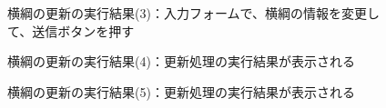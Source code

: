 \documentclass[10pt,a4paper,titlepage]{jreport}
\begin{document}
\begin{figure}[h]
	\begin{center}
	\end{center}
	\caption{横綱の更新の実行結果(3)：入力フォームで、横綱の情報を変更して、送信ボタンを押す
	}
	\label{fig:yokozuna_update3}
\end{figure}

\begin{figure}[h]
	\begin{center}
	\end{center}
	\caption{横綱の更新の実行結果(4)：更新処理の実行結果が表示される
	}
	\label{fig:yokozuna_update4}
\end{figure}

\begin{figure}[h]
	\begin{center}
	\end{center}
	\caption{横綱の更新の実行結果(5)：更新処理の実行結果が表示される
	}
	\label{fig:yokozuna_update5}
\end{figure}
\end{document}
